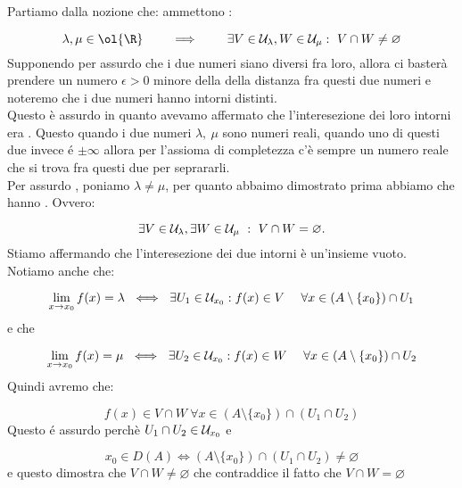 \documentclass[../analisi.tex]{subfiles}
\begin{document}
\begin{dimo}
Partiamo dalla nozione che:  ammettono :


\begin{equation}
	\lambda, \mu \in \ol{\R} \qquad \implies \qquad
	\exists V \in \mcl{U}_{\lambda}, W \in \mcl{U}_{\mu}:\ V \cap W \neq
	\varnothing
\end{equation}
Supponendo per assurdo che i due numeri siano diversi fra loro, allora 
ci basterà prendere un numero $\epsilon > 0$ minore della  della distanza
fra questi due numeri e noteremo che i due numeri hanno intorni distinti.\\
Questo è assurdo in quanto avevamo affermato che l'interesezione dei loro 
intorni era . Questo quando i due numeri $\lambda,\ \mu$ sono 
numeri reali, quando uno di questi due invece é $\pm \infty$ allora per
l'assioma di completezza c'è sempre un numero reale che si trova fra questi due per
seprararli.\\
\linebreak
Per assurdo \Lightning, poniamo $\lambda \neq \mu$, per quanto abbaimo dimostrato
prima abbiamo che  hanno . Ovvero:

\begin{equation}
	\exists V \in \mathcal{U}_{\lambda}, \exists W \in \mathcal{U}_{\mu}\ :\
	V \cap W = \varnothing.
\end{equation}
Stiamo affermando che l'interesezione dei due intorni è un'insieme vuoto.\\
Notiamo anche che:

\begin{equation}
	\lim \limits_{x \to x_0} f(x) = \lambda \ \iff\ \exists U_1 \in \mathcal{U}_{x_0} :
	f(x) \in V\ \quad \forall x \in (A \setminus \{x_0\} ) \cap U_1
\end{equation}
e che

\begin{equation}
	\lim \limits_{x \to x_0} f(x) = \mu \ \iff\ \exists U_2 \in \mathcal{U}_{x_0} :
	f(x) \in W\ \quad \forall x \in (A \setminus \{x_0\} ) \cap U_2
\end{equation}
Quindi avremo che:

\begin{equation}
	f(x) \in V \cap W\ \forall x \in ( A \setminus \{ x_0 \}) \cap (U_1 \cap
	U_2)
\end{equation}
Questo é assurdo perchè $U_1 \cap U_2 \in \mathcal{U}_{x_0}$ e 

\begin{equation}
	x_0 \in D(A) \iff (A \setminus \{ x_0 \} ) \cap ( U_1 \cap U_2 ) \neq
	\varnothing
\end{equation}
e questo dimostra che $V \cap W \neq \varnothing$ che contraddice il fatto che
$V \cap W = \varnothing$

\end{dimo}
\end{document}
